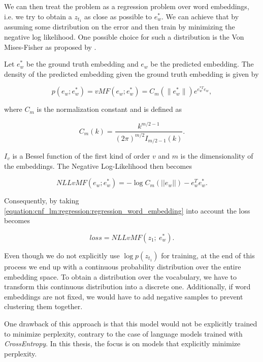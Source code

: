 We can then treat the problem as a regression problem over word embeddings, i.e. we try to obtain a $ z_{t_1} $ as close as possible to $ e_w^* $. We can achieve that by assuming some distribution on the error and then train by minimizing the negative log likelihood. One possible choice for such a distribution is the Von Mises-Fisher as proposed by \citet{kumar2018mises}.

Let $ e_w^* $ be the ground truth embedding and $ e_w $ be the predicted embedding. The density of the predicted embedding given the ground truth embedding is given by

\begin{displaymath}
    p(e_w; e_w^*) = vMF(e_w; e_w^*) = C_m(\| e_w^* \|) e^{e_w^{*T} e_w},
\end{displaymath}

where $ C_m $ is the normalization constant and is defined as

\begin{displaymath}
    C_m(k) = \frac{ k^{m/2 - 1} } { (2\pi)^{m/2} I_{m/2 - 1}(k) }.
\end{displaymath}

$ I_v $ is a Bessel function of the first kind of order $ v $ and $ m $ is the dimensionality of the embeddings. The Negative Log-Likelihood then becomes

\begin{displaymath}
    NLLvMF(e_w; e_w^*) = - \log C_m(|| e_w ||) - e_w^T e_w^*.
\end{displaymath}

Consequently, by taking \ref{equation:cnf_lm:regression:regression_word_embedding} into account the loss becomes

\begin{displaymath}
    loss =  NLLvMF(z_1; \ e_w^*).
\end{displaymath}

Even though we do not explicitly use $ \log p(z_{t_1}) $ for training, at the end of this process we end up with a continuous probability distribution over the entire embedding space. To obtain a distribution over the vocabulary, we have to transform this continuous distribution into a discrete one. Additionally, if word embeddings are not fixed, we would have to add negative samples to prevent clustering them together. 

One drawback of this approach is that this model would not be explicitly trained to minimize perplexity, contrary to the case of language models trained with \emph{CrossEntropy}. In this thesis, the focus is on models that explicitly minimize perplexity.

